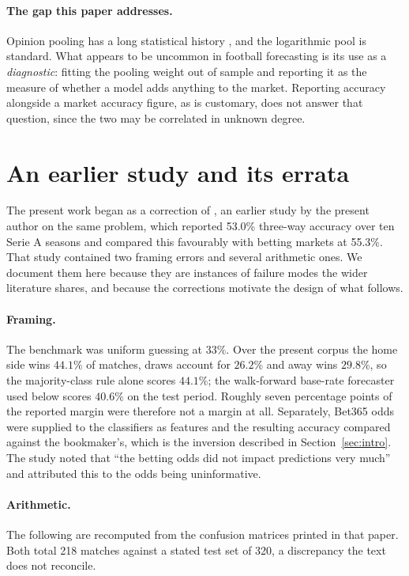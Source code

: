 \documentclass[11pt]{article}
\begin{document}
\paragraph{The gap this paper addresses.} Opinion pooling has a long statistical
history \citep{genest1986}, and the logarithmic pool is standard. What appears
to be uncommon in football forecasting is its use as a \emph{diagnostic}: fitting
the pooling weight out of sample and reporting it as the measure of whether a
model adds anything to the market. Reporting accuracy alongside a market
accuracy figure, as is customary, does not answer that question, since the two
may be correlated in unknown degree.

\section{An earlier study and its errata}
\label{sec:errata}

The present work began as a correction of \citet{pitcan2018}, an earlier study
by the present author on the same problem, which reported 53.0\% three-way
accuracy over ten Serie A seasons and compared this favourably with betting
markets at 55.3\%. That study contained two framing errors and several
arithmetic ones. We document them here because they are instances of failure
modes the wider literature shares, and because the corrections motivate the
design of what follows.

\paragraph{Framing.} The benchmark was uniform guessing at $33\%$. Over the
present corpus the home side wins $44.1\%$ of matches, draws account for
$26.2\%$ and away wins $29.8\%$, so the majority-class rule alone scores
$44.1\%$; the walk-forward base-rate forecaster used below scores $40.6\%$ on
the test period. Roughly seven percentage points of the reported margin were
therefore not a margin at all. Separately, Bet365 odds were supplied to the
classifiers as features and the resulting accuracy compared against the
bookmaker's, which is the inversion described in Section~\ref{sec:intro}. The
study noted that ``the betting odds did not impact predictions very much'' and
attributed this to the odds being uninformative.

\paragraph{Arithmetic.} The following are recomputed from the confusion
matrices printed in that paper. Both total 218 matches against a stated test
set of 320, a discrepancy the text does not reconcile.
\end{document}
